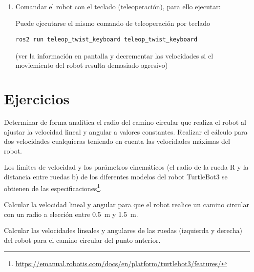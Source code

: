\documentclass[tp]{lcc}
\begin{document}
\begin{enumerate}
	\begin{enumerate}
	\item En una nueva terminal o pestaña, ejecutar el comando:

\begin{lstlisting}[style=bash] 
ros2 topic pub --rate 1 /cmd_vel geometry_msgs/msg/Twist "{linear: {x: 0.2, y: 0.0, z: 0.0}, angular: {x: 0.0, y: 0.0, z: 0.2}}"
\end{lstlisting}

	\item Detener el robot fijando la velocidad lineal y angular a cero.
	\end{enumerate}

\item Comandar el robot con el teclado (teleoperación), para ello ejecutar:

Puede ejecutarse el mismo comando de teleoperación por teclado
\begin{lstlisting}[style=bash] 
ros2 run teleop_twist_keyboard teleop_twist_keyboard
\end{lstlisting}
(ver la información en pantalla y decrementar las velocidades si el moviemiento del robot
resulta demasiado agresivo)
\end{enumerate}


\section{Ejercicios}

\ejercicio  Determinar de forma analítica el radio del camino circular que realiza el robot al ajustar la velocidad lineal y angular a valores constantes. Realizar el cálculo para dos velocidades cualquieras teniendo en cuenta las velocidades máximas del robot.

\begin{nota}
	Los límites de velocidad y los parámetros cinemáticos (el radio de la rueda R y la distancia entre ruedas b) de los diferentes modelos del robot TurtleBot3 se obtienen de las especificaciones\footnote{\url{https://emanual.robotis.com/docs/en/platform/turtlebot3/features/}}.
\end{nota}

\ejercicio  Calcular la velocidad lineal y angular para que el robot realice un camino circular con un radio a elección entre \SI{0.5}{\meter} y \SI{1.5}{\meter}.

\ejercicio  Calcular las velocidades lineales y angulares de las ruedas (izquierda y derecha) del robot para el camino circular del punto anterior.
\end{document}
